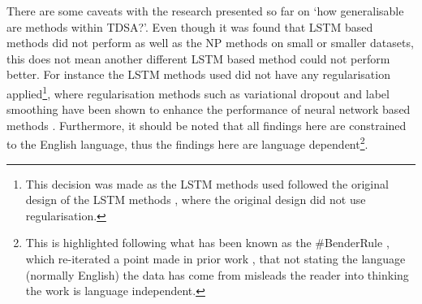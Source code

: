 There are some caveats with the research presented so far on `how generalisable are methods within TDSA?’. Even though it was found that LSTM based methods did not perform as well as the NP methods on small or smaller datasets, this does not mean another different LSTM based method could not perform better. For instance the LSTM methods used did not have any regularisation applied\footnote{This decision was made as the LSTM methods used followed the original design of the LSTM methods \citep{tang-etal-2016-effective}, where the original design did not use regularisation.}, where regularisation methods such as variational dropout \citep{gal2016theoretically} and label smoothing \citep{szegedy2016rethinking} have been shown to enhance the performance of neural network based methods \citep{gal2016theoretically, song2019attentional}. Furthermore, it should be noted that all findings here are constrained to the English language, thus the findings here are language dependent\footnote{This is highlighted following what has been known as the \#BenderRule \citep{bender2019rule}, which re-iterated a point made in prior work \citep{bender2011achieving}, that not stating the language (normally English) the data has come from misleads the reader into thinking the work is language independent.}.

